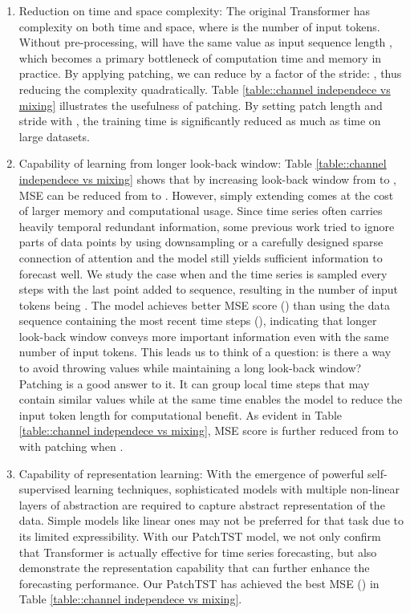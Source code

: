 \documentclass{article} \usepackage{iclr2023_conference,times}
\begin{document}
\begin{enumerate}[leftmargin= 25 pt,itemsep= 5 pt,topsep = 0 pt]
    \item Reduction on time and space complexity: The original Transformer has  complexity on both time and space, where  is the number of input tokens. Without pre-processing,  will have the same value as input sequence length , which becomes a primary bottleneck of computation time and memory in practice. By applying patching, we can reduce  by a factor of the stride: , thus reducing the complexity quadratically. Table \ref{table::channel independece vs mixing} illustrates the usefulness of patching. By setting patch length  and
    stride  with , the training time is significantly reduced as much as  time on large datasets.

    \item Capability of learning from longer look-back window: Table \ref{table::channel independece vs mixing} shows that by increasing look-back window  from  to , MSE can be reduced from  to . However, simply extending  comes at the cost of larger memory and computational usage. 
    Since time series often carries heavily temporal redundant information, some previous work tried to ignore parts of data points by using downsampling or a carefully designed sparse connection of attention \citep{logtrans} and the model still yields sufficient information to forecast well. 
    We study the case when  and the time series is sampled every  steps with the last point added to sequence, resulting in the number of input tokens being . The model achieves better MSE score () than using the data sequence containing the most recent  time steps (), indicating that longer look-back window conveys more important information even with the same number of input tokens. This leads us to think of a question: is there a way to avoid throwing values while maintaining a long look-back window? Patching is a good answer to it. It can group local time steps that may contain similar values while at the same time enables the model to reduce the input token length for computational benefit. As evident in Table \ref{table::channel independece vs mixing}, MSE score is further reduced from  to  with patching when .

    
    \item Capability of representation learning: With the emergence of powerful self-supervised learning techniques, sophisticated models with multiple non-linear layers of abstraction are required to capture abstract representation of the data. Simple models like linear ones \citep{dlinear} may not be preferred for that task due to its limited expressibility. With our PatchTST model, we not only confirm that Transformer is actually effective for time series forecasting, but also demonstrate the representation capability that can further enhance the forecasting performance. Our PatchTST has achieved the best MSE () in Table \ref{table::channel independece vs mixing}.
\end{enumerate}
\end{document}
